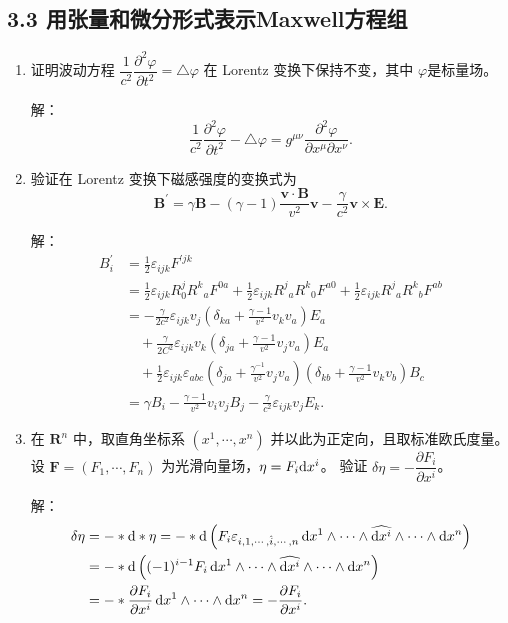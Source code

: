\subsection{3.3 用张量和微分形式表示Maxwell方程组}
\begin{enumerate}
\item 证明波动方程 $\dfrac{1}{c^2} \dfrac{\partial^2 \varphi}{\partial t^2}=\triangle \varphi$ 在 Lorentz 变换下保持不变，其中 $\varphi$是标量场。

解：\[\frac{1}{c^{2}} \frac{\partial^{2} \varphi}{\partial t^{2}}-\triangle \varphi
=g^{\mu \nu} \frac{\partial^{2} \varphi}{\partial x^{\mu} \partial x^{\nu}}.\]

\item 验证在 Lorentz 变换下磁感强度的变换式为
$$\boldsymbol{B}^{\prime}=\gamma \boldsymbol{B}-(\gamma-1) \frac{\boldsymbol{v} \cdot \boldsymbol{B}}{v^2} \boldsymbol{v}-\frac{\gamma}{c^2} \boldsymbol{v} \times \boldsymbol{E}.$$

解：\begin{align*}
B_{i}^{\prime} & = \frac{1}{2} \varepsilon_{ijk} F^{\prime jk} \\
& = \frac{1}{2} \varepsilon_{ijk} R_{0}^{j} R^{k}{ }_{a} F^{0a}
+ \frac{1}{2} \varepsilon_{ijk} R^{j}{ }_{a} R^{k}{ }_{0} F^{a0} 
+ \frac{1}{2} \varepsilon_{ijk} R^{j}{ }_{a}R^{k}{ }_{b} F^{ab} \\
& = -\frac{\gamma}{2c^{2}} \varepsilon_{ijk} v_{j}\left(\delta_{ka}+\frac{\gamma-1}{v^{2}} v_{k} v_{a}\right) E_{a} \\
& \quad +\frac{\gamma}{2C^{2}} \varepsilon_{ijk} v_{k}\left(\delta_{ja}+\frac{\gamma-1}{v^{2}} v_{j} v_{a}\right) E_{a} \\
& \quad +\frac{1}{2} \varepsilon_{ijk} \varepsilon_{abc}\left(\delta_{ja}+\frac{\gamma^{-1}}{v^{2}} v_{j} v_{a}\right)\left(\delta_{kb}+\frac{\gamma-1}{v^{2}} v_{k} v_{b}\right) B_{c} \\
& = \gamma B_{i}-\frac{\gamma-1}{v^{2}} v_{i} v_{j} B_{j}-\frac{\gamma}{c^{2}} \varepsilon_{i j k} v_{j} E_{k} .
\end{align*}

\item 在 $\mathbf{R}^n$ 中，取直角坐标系 $(x^1, \cdots, x^n)$ 并以此为正定向，且取标准欧氏度量。
设 $\boldsymbol{F}=(F_1, \cdots, F_n)$ 为光滑向量场，$\eta=F_i {\rm d} x^i$。
验证 $\delta \eta=-\dfrac{\partial F_i}{\partial x^i}$。

解：\begin{align*}
\delta \eta & =-* {\rm d} * \eta=-* {\rm d}\left(F_{i} \varepsilon_{i,1,\cdots,\hat{i},\cdots,n} \,{\rm d} x^{1} \wedge \cdots \wedge \widehat{{\rm d} x^{i}} \wedge \cdots \wedge {\rm d} x^{n}\right) \\
& =-* {\rm d}\left((-1)^{i-1} F_{i} \,{\rm d} x^{1} \wedge \cdots \wedge \widehat{{\rm d} x^{i}} \wedge \cdots \wedge {\rm d} x^{n}\right) \\
& =-* \frac{\partial F_{i}}{\partial x^{i}} \,{\rm d} x^{1} \wedge \cdots \wedge {\rm d} x^{n}=-\frac{\partial F_{i}}{\partial x^{i}}.
\end{align*}


\end{enumerate}
